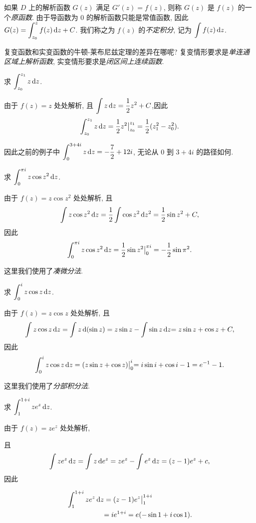 \documentclass[nocolor,theme=doremi,lang=cn,11pt,chinese,twoside,openright,usesamecnt]{elegantbook}
\begin{document}
如果 $D$ 上的解析函数 $G(z)$ 满足 $G'(z)=f(z)$, 则称 $G(z)$ 是 $f(z)$ 的一个\emph{原函数}.
由于导函数为 $0$ 的解析函数只能是常值函数,
因此 $\displaystyle G(z)=\int_{z_0}^zf(z)\,\mathrm{d} z+C$.
我们称之为 $f(z)$ 的\emph{不定积分}, 记为 \emph{$\displaystyle\int f(z)\,\mathrm{d} z$}.

复变函数和实变函数的牛顿-莱布尼兹定理的差异在哪呢?
复变情形要求是\emph{单连通区域上解析函数}, 实变情形要求是\emph{闭区间上连续函数}.

\begin{example}
	求 $\displaystyle\int_{z_0}^{z_1}z\,\mathrm{d} z$.
\end{example}

\begin{solution}
	由于 $f(z)=z$ 处处解析,
	{且 $\displaystyle\int z\,\mathrm{d} z=\frac{1}{2}  z^2+C$,因此
	\[\int_{z_0}^{z_1}z\,\mathrm{d} z=\frac{1}{2} z^2\big|_{z_0}^{z_1}=\frac{1}{2} (z_1^2-z_0^2).\]}
\end{solution}
因此之前的例子中 $\displaystyle\int_0^{3+4i}z\,\mathrm{d} z=-\frac72+12i$, 无论从 $0$ 到 $3+4i$ 的路径如何.

\begin{example}
	求 $\displaystyle\int_0^{\pi i}z\cos z^2\,\mathrm{d} z$.
\end{example}

\begin{solution}
	由于 $f(z)=z\cos z^2$ 处处解析,
	{且
	\[\int z\cos z^2\,\mathrm{d} z=\frac{1}{2}\int \cos z^2\,\mathrm{d} z^2=\frac{1}{2}\sin z^2+C,\]因此
	\[\int_0^{\pi i}z\cos z^2\,\mathrm{d} z=\frac{1}{2}\sin z^2\big|_0^{\pi i}=-\frac{1}{2}\sin \pi^2.\]}
\end{solution}

这里我们使用了\emph{凑微分法}.

\begin{example}
	求 $\displaystyle\int_0^i z\cos z\,\mathrm{d} z$.
\end{example}

\begin{solution}
	由于 $f(z)=z\cos z$ 处处解析,
	{且
		\[\int z\cos z\,\mathrm{d} z
		=\int z\,\mathrm{d}(\sin z)
		=z\sin z-\int \sin z\,\mathrm{d} z
		{=z\sin z+\cos z+C,}\]因此
		\[\int_0^i z\cos z\,\mathrm{d} z
		=(z\sin z+\cos z)\big|_0^i
		{=i\sin i+\cos i-1=e^{-1}-1.}
		\]}
\end{solution}

这里我们使用了\emph{分部积分法}.

\begin{example}
	求 $\displaystyle\int_1^{1+i} z e^z\,\mathrm{d} z$.
\end{example}

\begin{solution}
	由于 $f(z)=ze^z$ 处处解析,
	{且
	\[\int z e^z\,\mathrm{d} z=\int z\,\mathrm{d} e^z=ze^z-\int e^z\,\mathrm{d} z=(z-1)e^z+c,\]因此

		\begin{align*}
		\int_1^{1+i} z e^z\,\mathrm{d} z&=(z-1)e^z\big|_1^{1+i}\\
		&{=ie^{1+i}=e(-\sin 1+i\cos 1).}
		\end{align*}}
\end{solution}
\end{document}
